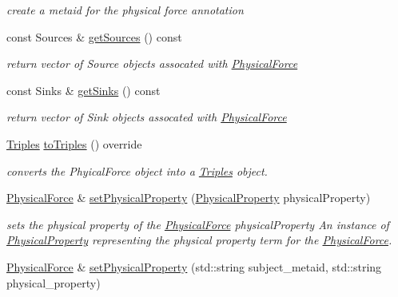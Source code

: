 \begin{DoxyCompactItemize}
\begin{DoxyCompactList}\small\item\em create a metaid for the physical force annotation \end{DoxyCompactList}\item 
const Sources \& \hyperlink{classomexmeta_1_1PhysicalForce_aa42b8e04573d2ae88f952c76b146d5ac}{get\+Sources} () const
\begin{DoxyCompactList}\small\item\em return vector of Source objects assocated with \hyperlink{classomexmeta_1_1PhysicalForce}{Physical\+Force} \end{DoxyCompactList}\item 
const Sinks \& \hyperlink{classomexmeta_1_1PhysicalForce_ab37bbe3a0f762066fdb43e5c2ce608eb}{get\+Sinks} () const
\begin{DoxyCompactList}\small\item\em return vector of Sink objects assocated with \hyperlink{classomexmeta_1_1PhysicalForce}{Physical\+Force} \end{DoxyCompactList}\item 
\hyperlink{classomexmeta_1_1Triples}{Triples} \hyperlink{classomexmeta_1_1PhysicalForce_a39dd511aee85130d07cb6ffb3f8e87f0}{to\+Triples} () override
\begin{DoxyCompactList}\small\item\em converts the Phyical\+Force object into a \hyperlink{classomexmeta_1_1Triples}{Triples} object. \end{DoxyCompactList}\item 
\hyperlink{classomexmeta_1_1PhysicalForce}{Physical\+Force} \& \hyperlink{classomexmeta_1_1PhysicalForce_a081aecc43d16b2fc8826c4050eb2055d}{set\+Physical\+Property} (\hyperlink{classomexmeta_1_1PhysicalProperty}{Physical\+Property} physical\+Property)
\begin{DoxyCompactList}\small\item\em sets the physical property of the \hyperlink{classomexmeta_1_1PhysicalForce}{Physical\+Force}  physical\+Property An instance of \hyperlink{classomexmeta_1_1PhysicalProperty}{Physical\+Property} representing the physical property term for the \hyperlink{classomexmeta_1_1PhysicalForce}{Physical\+Force}. \end{DoxyCompactList}\item 
\hyperlink{classomexmeta_1_1PhysicalForce}{Physical\+Force} \& \hyperlink{classomexmeta_1_1PhysicalForce_a3f979432322d40efc8a15cf5ee883100}{set\+Physical\+Property} (std\+::string subject\+\_\+metaid, std\+::string physical\+\_\+property)

\end{DoxyCompactItemize}
